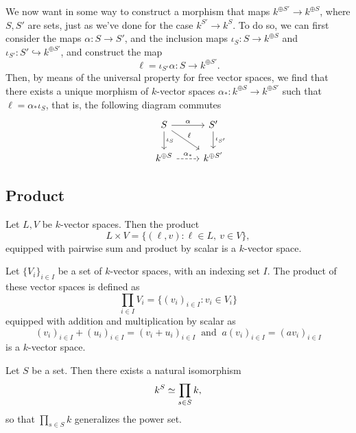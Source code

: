 We now want in some way to construct a morphism that maps \(k^{\oplus S'} \to
k^{\oplus S}\), where \(S, S'\) are sets, just as we've done for the case
\(k^{S'} \to k^S\). To do so, we can first consider the maps \(\alpha: S \to
S'\), and the inclusion maps \(\iota_S : S \to k^{\oplus S}\) and \(\iota_{S'} :
S' \hookrightarrow k^{\oplus S'}\), and construct the map
\[
    \ell = \iota_{S'}  \alpha : S \to k^{\oplus S'}.
\]
Then, by means of the universal property for free vector spaces, we find that
there exists a unique morphism of \(k\)-vector spaces \(\alpha_\ast : k^{\oplus
        S} \to k^{\oplus S'} \) such that \(\ell = \alpha_\ast  \iota_S\), that is,
the following diagram commutes
\[
    \begin{tikzcd}
        &S \arrow[r, "\alpha"] \arrow[d, "\iota_S"] \arrow[dr, "\ell"]
        &S' \arrow[d, "\iota_{S'}"]
        \\
        &k^{\oplus S} \arrow[r, dashed, "\alpha_\ast"]
        &k^{\oplus S'}
    \end{tikzcd}
\]

\subsection{Product}

\begin{definition}
    Let \(L, V\) be \(k\)-vector spaces. Then the product
    \[
        L \times V = \{(\ell, v) \colon \ell \in L,\ v \in V\},
    \]
    equipped with pairwise sum and product by scalar is a \(k\)-vector space.
\end{definition}

\begin{definition}
    Let \(\{V_i\}_{i \in I}\) be a set of \(k\)-vector spaces, with an indexing
    set \(I\). The product of these vector spaces is defined as
    \[
        \prod_{i \in I} V_i = \{(v_i)_{i \in I} \colon v_i \in V_i\}
    \]
    equipped with addition and multiplication by scalar as
    \[
        (v_i)_{i \in I} + (u_i)_{i \in I} = (v_i + u_i)_{i \in I}\ \text{ and }\
        a(v_i)_{i \in I} = (av_i)_{i \in I}
    \]
    is a \(k\)-vector space.
\end{definition}

\begin{proposition}
    Let \(S\) be a set. Then there exists a natural isomorphism
    \[
        k^S \simeq \prod_{s \in S} k,
    \]
    so that \(\prod_{s \in S} k\) generalizes the power set.
\end{proposition}

